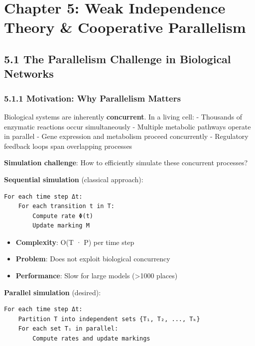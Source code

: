 \hypertarget{chapter-5-weak-independence-theory-cooperative-parallelism}{%
\chapter{Chapter 5: Weak Independence Theory \& Cooperative
Parallelism}\label{chapter-5-weak-independence-theory-cooperative-parallelism}}

\hypertarget{the-parallelism-challenge-in-biological-networks}{%
\section{5.1 The Parallelism Challenge in Biological
Networks}\label{the-parallelism-challenge-in-biological-networks}}

\hypertarget{motivation-why-parallelism-matters}{%
\subsection{5.1.1 Motivation: Why Parallelism
Matters}\label{motivation-why-parallelism-matters}}

Biological systems are inherently \textbf{concurrent}. In a living cell:
- Thousands of enzymatic reactions occur simultaneously - Multiple
metabolic pathways operate in parallel - Gene expression and metabolism
proceed concurrently - Regulatory feedback loops span overlapping
processes

\textbf{Simulation challenge}: How to efficiently simulate these
concurrent processes?

\textbf{Sequential simulation} (classical approach):

\begin{lstlisting}
For each time step Δt:
    For each transition t in T:
        Compute rate Φ(t)
        Update marking M
\end{lstlisting}

\begin{itemize}
\tightlist
\item
  \textbf{Complexity}: O(\textbar T\textbar{} · \textbar P\textbar) per
  time step
\item
  \textbf{Problem}: Does not exploit biological concurrency
\item
  \textbf{Performance}: Slow for large models (\textgreater1000 places)
\end{itemize}

\textbf{Parallel simulation} (desired):

\begin{lstlisting}
For each time step Δt:
    Partition T into independent sets {T₁, T₂, ..., Tₖ}
    For each set Tᵢ in parallel:
        Compute rates and update markings
\end{lstlisting}

